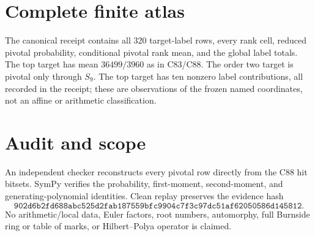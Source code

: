 \documentclass[10pt]{article}
\begin{document}
\section{Complete finite atlas}
The canonical receipt contains all 320 target-label rows, every rank cell,
reduced pivotal probability, conditional pivotal rank mean, and the global
label totals.  The top target has mean $36499/3960$ as in C83/C88.  The order
two target is pivotal only through $S_9$.  The top target has ten nonzero
label contributions, all recorded in the receipt; these are observations of
the frozen named coordinates, not an affine or arithmetic classification.

\section{Audit and scope}
An independent checker reconstructs every pivotal row directly from the C88
hit bitsets.  SymPy verifies the probability, first-moment, second-moment,
and generating-polynomial identities.  Clean replay preserves the evidence
hash
\[
\texttt{902d6b2fd688abc525d2fab187559bfc9904c7f3c97dc51af62050586d145812}.
\]
No arithmetic/local data, Euler factors, root numbers, automorphy, full
Burnside ring or table of marks, or Hilbert--Polya operator is claimed.
\end{document}
